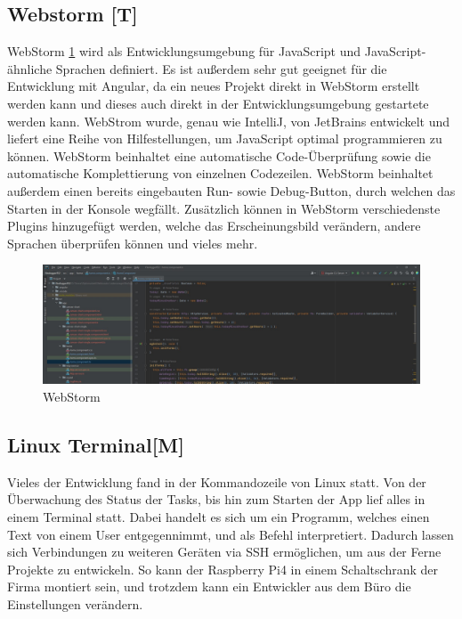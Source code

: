 \subsection{Webstorm [T]} 
WebStorm \ref{fig:impl:webstorm} wird als Entwicklungsumgebung für JavaScript und JavaScript-ähnliche Sprachen definiert. Es ist außerdem sehr gut geeignet für die Entwicklung mit Angular, da ein neues Projekt direkt in WebStorm erstellt werden kann und dieses auch direkt in der Entwicklungsumgebung gestartete werden kann. WebStrom wurde, genau wie IntelliJ, von JetBrains entwickelt und liefert eine Reihe von Hilfestellungen, um JavaScript optimal programmieren zu können. WebStorm beinhaltet eine automatische Code-Überprüfung sowie die automatische Komplettierung von einzelnen Codezeilen. WebStorm beinhaltet außerdem einen bereits eingebauten Run- sowie Debug-Button, durch welchen das Starten in der Konsole wegfällt. Zusätzlich können in WebStorm verschiedenste Plugins hinzugefügt werden, welche das Erscheinungsbild verändern, andere Sprachen überprüfen können und vieles mehr. \cite{webstormOfficialSite}

\begin{figure}[h t]
    \centering
    \includegraphics[scale=0.38]{pics/webstorm.jpg}
    \caption{WebStorm}
    \label{fig:impl:webstorm}
  \end{figure}


\subsection{Linux Terminal[M]} 
Vieles der Entwicklung fand in der Kommandozeile von Linux statt. Von der Überwachung des Status der Tasks, bis hin zum Starten der App lief alles in einem Terminal statt. Dabei handelt es sich um ein Programm, welches einen Text von einem User entgegennimmt, und als Befehl interpretiert. Dadurch lassen sich Verbindungen zu weiteren Geräten via SSH ermöglichen, um aus der Ferne Projekte zu entwickeln. So kann der Raspberry Pi4 in einem Schaltschrank der Firma montiert sein, und trotzdem kann ein Entwickler aus dem Büro die Einstellungen verändern.   

